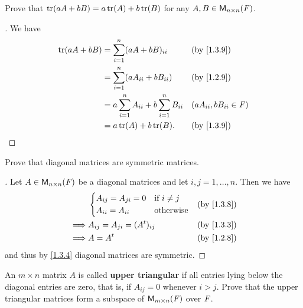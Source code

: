 \begin{ex}\label{ex:1.3.6}
	Prove that \(\tr[aA + bB] = a\tr[A] + b\tr[B]\) for any \(A, B \in \mathsf{M}_{{n} \times n}({\mathit{F}})\).
\end{ex}

\begin{proof}[]
	We have
	\begin{align*}
		\tr[aA + bB] & = \sum_{i = 1}^n (aA + bB)_{i i}                      &  & \by{1.3.9}                  \\
		             & = \sum_{i = 1}^n (aA_{i i} + bB_{i i})                &  & \by{1.2.9}                  \\
		             & = a \sum_{i = 1}^n A_{i i} + b \sum_{i = 1}^n B_{i i} &  & (aA_{i i}, bB_{i i} \in \F) \\
		             & = a\tr[A] + b\tr[B].                                  &  & \by{1.3.9}
	\end{align*}
\end{proof}

\begin{ex}\label{ex:1.3.7}
	Prove that diagonal matrices are symmetric matrices.
\end{ex}

\begin{proof}[]
	Let \(A \in \mathsf{M}_{{n} \times n}({\mathit{F}})\) be a diagonal matrices and let \(i, j = 1, \dots, n\).
	Then we have
	\begin{align*}
		         & \begin{dcases}
			           A_{i j} = A_{j i} = 0 & \text{if } i \neq j \\
			           A_{i i} = A_{i i}     & \text{otherwise}
		           \end{dcases} &  & \by{1.3.8}                    \\
		\implies & A_{i j} = A_{j i} = (\tp{A})_{i j}             &  & \by{1.3.3} \\
		\implies & A = \tp{A}                                     &  & \by{1.2.8}
	\end{align*}
	and thus by \cref{1.3.4} diagonal matrices are symmetric.
\end{proof}

\setcounter{ex}{11}
\begin{ex}\label{ex:1.3.12}
	An \(m \times n\) matrix \(A\) is called \textbf{upper triangular} if all entries lying below the diagonal entries are zero, that is, if \(A_{i j} = 0\) whenever \(i > j\).
	Prove that the upper triangular matrices form a subspace of \(\mathsf{M}_{{m} \times n}({\mathit{F}})\) over \(\mathit{F}\).
\end{ex}

